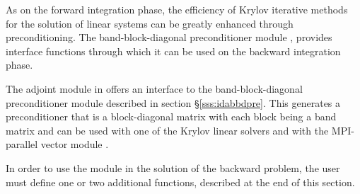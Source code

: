 As on the forward integration phase, the efficiency of Krylov iterative methods 
for the solution of linear systems can be greatly enhanced through preconditioning.
The band-block-diagonal preconditioner module {\idabbdpre},
provides interface functions through which it can be used on the backward integration phase.

The adjoint module in {\idas} offers an interface to the band-block-diagonal
preconditioner module {\idabbdpre} described in section \S\ref{sss:idabbdpre}.
This generates a preconditioner that is a block-diagonal matrix with each
block being a band matrix and can be used with one of the Krylov linear solvers
and with the MPI-parallel vector module {\nvecp}.

In order to use the {\idabbdpre} module in the solution of the backward problem,
the user must define one or two additional functions, described at the end of this section. 

